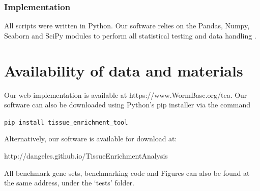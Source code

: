 \documentclass[linenumbers, doublespacing]{bmcart}
\begin{document}
\subsubsection*{Implementation}
All scripts were written in Python. Our software relies on the Pandas, Numpy, Seaborn and SciPy modules to perform all statistical testing and data handling \cite{McKinney2011, VanDerWalt2011, Oliphant2007}.


\section*{Availability of data and materials}
Our web implementation is available at https://www.WormBase.org/tea. Our software can also be downloaded using Python's pip installer via the command

\texttt{pip install tissue\_enrichment\_tool}

Alternatively, our software is available for download at:

http://dangeles.github.io/TissueEnrichmentAnalysis

All benchmark gene sets, benchmarking code and Figures can also be found at the same address, under the `tests' folder.
\end{document}
